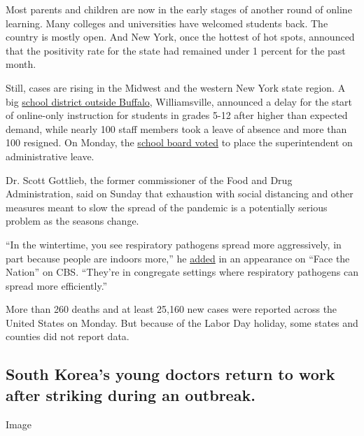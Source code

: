 Most parents and children are now in the early stages of another round
of online learning. Many colleges and universities have welcomed
students back. The country is mostly open. And New York, once the
hottest of hot spots, announced that the positivity rate for the state
had remained under 1 percent for the past month.

Still, cases are rising in the Midwest and the western New York state
region. A big
\href{https://cms5.revize.com/revize/williamsvilleschools/Departments/Communications/2020-2021/SGM\%20Letters/9-4-20\%20Update\%20to\%20Families\%20Delayed\%20Reopening.pdf?fbclid=IwAR3IZDGyUkVTOELjggj2i-yP4pCEE4DtuDoKYBZ_yF36cdVzLkshIOnUpYY}{school
district outside Buffalo}, Williamsville, announced a delay for the
start of online-only instruction for students in grades 5-12 after
higher than expected demand, while nearly 100 staff members took a leave
of absence and more than 100 resigned. On Monday, the
\href{https://www.wivb.com/news/top-stories/williamsville-places-superintendent-on-administrative-leave/}{school
board voted} to place the superintendent on administrative leave.

Dr. Scott Gottlieb, the former commissioner of the Food and Drug
Administration, said on Sunday that exhaustion with social distancing
and other measures meant to slow the spread of the pandemic is a
potentially serious problem as the seasons change.

``In the wintertime, you see respiratory pathogens spread more
aggressively, in part because people are indoors more,'' he
\href{https://www.cbsnews.com/news/transcript-scott-gottlieb-discusses-coronavirus-on-face-the-nation-september-6-2020/}{added}
in an appearance on ``Face the Nation'' on CBS. ``They're in congregate
settings where respiratory pathogens can spread more efficiently.''

More than 260 deaths and at least 25,160 new cases were reported across
the United States on Monday. But because of the Labor Day holiday, some
states and counties did not report data.

\hypertarget{south-koreas-young-doctors-return-to-work-after-striking-during-an-outbreak}{%
\subsection{South Korea's young doctors return to work after striking
during an
outbreak.}\label{south-koreas-young-doctors-return-to-work-after-striking-during-an-outbreak}}

Image


